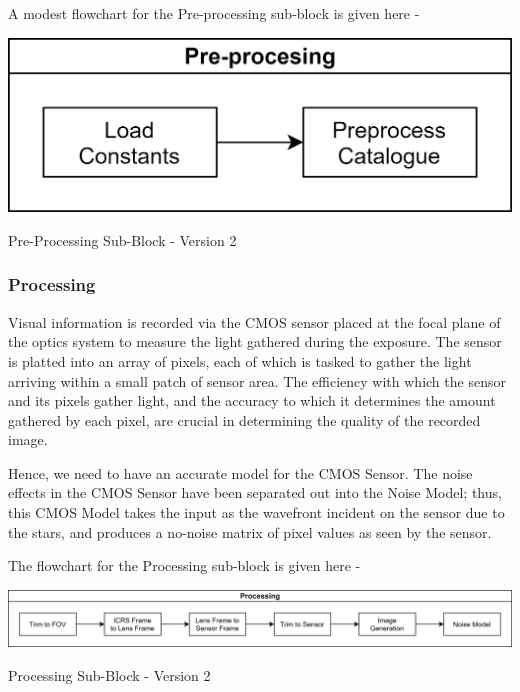 A modest flowchart for the Pre-processing sub-block is given here -

\begin{Flowchart}[h!]
    \centering
    \includegraphics[scale=0.09]{Figures/Model/Pre-processing.png}
    \caption{Pre-Processing Sub-Block - Version 2}
    \label{fig:SIS_v2_PP}
\end{Flowchart}


\subsubsection{Processing}
Visual information is recorded via the CMOS sensor placed at the focal plane of the optics system to measure the light gathered during the exposure. The sensor is platted into an array of pixels, each of which is tasked to gather the light arriving within a small patch of sensor area. The efficiency with which the sensor and its pixels gather light, and the accuracy to which it determines the amount gathered by each pixel, are crucial in determining the quality of the recorded image. \cite{DSLRs} 

Hence, we need to have an accurate model for the CMOS Sensor. The noise effects in the CMOS Sensor have been separated out into the Noise Model; thus, this CMOS Model takes the input as the wavefront incident on the sensor due to the stars, and produces a no-noise matrix of pixel values as seen by the sensor. 

The flowchart for the Processing sub-block is given here -

\begin{Flowchart}[h!]
    \centering
    \includegraphics[scale=0.09]{Figures/Model/Processing.png}
    \caption{Processing Sub-Block - Version 2}
    \label{fig:SIS_v2_PR}
\end{Flowchart}

